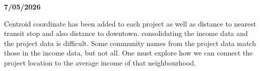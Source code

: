 \documentclass{article}
\begin{document}
        \begin{flushleft}
            \textbf{7/05/2026}
        \end{flushleft}

        Centroid coordinate has been added to each project as well as distance to nearest transit stop and also distance to downtown. consolidating the income data and the project data is difficult. Some community names from the project data match those in the income data, but not all. One must explore how we can connect the project location to the average income of that neighbourhood.
    

        
\end{document}
